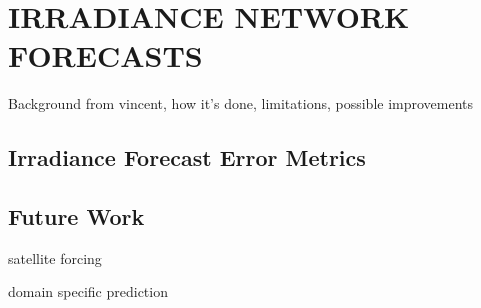 \chapter{IRRADIANCE NETWORK FORECASTS}
\label{chap:network}

Background from vincent, how it's done, limitations, possible
improvements

\section{Irradiance Forecast Error Metrics}

\section{Future Work}
satellite forcing

domain specific prediction

